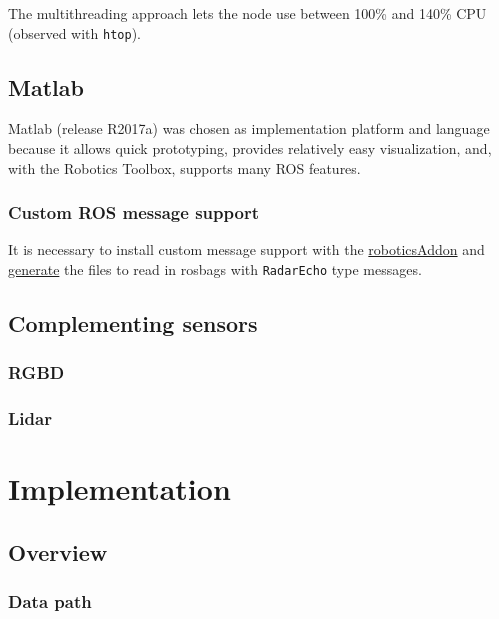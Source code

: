 The multithreading approach lets the node use between 100\% and 140\%
CPU (observed with \texttt{htop}).

\subsection{Matlab}\label{matlab}

Matlab (release R2017a) was chosen as implementation platform and
language because it allows quick prototyping, provides relatively easy
visualization, and, with the Robotics Toolbox, supports many ROS
features.

\subsubsection{Custom ROS message
support}\label{custom-ros-message-support}

It is necessary to install custom message support with the
\href{https://www.mathworks.com/help/robotics/ref/roboticsaddons.html}{roboticsAddon}
and
\href{https://www.mathworks.com/help/robotics/ug/create-custom-messages-from-ros-package.html}{generate}
the files to read in rosbags with \texttt{RadarEcho} type messages.

\subsection{Complementing sensors}\label{complementing-sensors}

\subsubsection{RGBD}\label{rgbd}

\subsubsection{Lidar}\label{lidar}

\section{Implementation}\label{implementation-1}

\subsection{Overview}\label{overview}

\subsubsection{Data path}\label{data-path}


